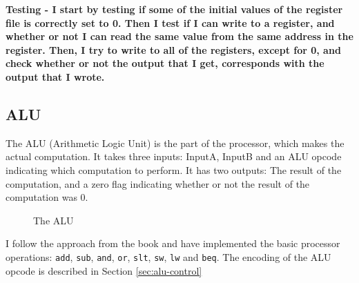 \bf{Testing} - I start by testing if some of the initial values of the register
file is correctly set to 0. Then I test if I can write to a register, and
whether or not I can read the same value from the same address in the register.
Then, I try to write to all of the registers, except for 0, and check whether
or not the output that I get, corresponds with the output that I wrote.

\subsection{ALU}
The ALU (Arithmetic Logic Unit) is the part of the processor, which makes the
actual computation. It takes three inputs: InputA, InputB and an ALU opcode
indicating which computation to perform. It has two outputs: The result of the
computation, and a zero flag indicating whether or not the result of the
computation was 0.

\begin{figure}
    \centering
    \caption{The ALU}
    \label{fig:alu}
\end{figure}

I follow the approach from the book %
and have implemented the basic processor operations: \texttt{add}, \texttt{sub},
\texttt{and}, \texttt{or}, \texttt{slt}, \texttt{sw}, \texttt{lw} and
\texttt{beq}. The encoding of the ALU opcode is described in Section
\ref{sec:alu-control}

